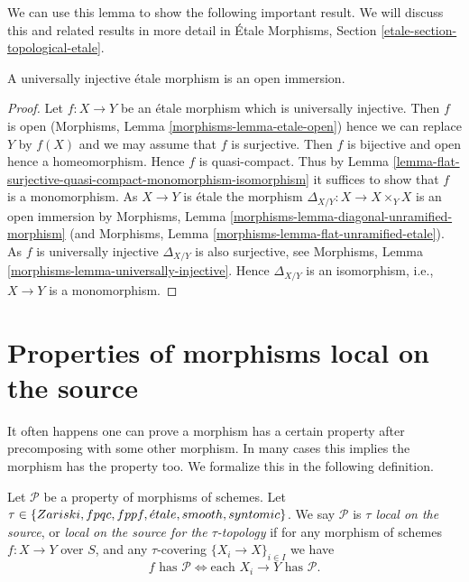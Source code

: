 \noindent
We can use this lemma to show the following important result.
We will discuss this and related results in more detail in
\'Etale Morphisms, Section \ref{etale-section-topological-etale}.

\begin{lemma}
\label{lemma-universally-injective-etale-open-immersion}
A universally injective \'etale morphism is an open immersion.
\end{lemma}

\begin{proof}
Let $f : X \to Y$ be an \'etale morphism which is universally injective.
Then $f$ is open
(Morphisms, Lemma \ref{morphisms-lemma-etale-open})
hence we can replace $Y$ by $f(X)$ and we may assume that $f$ is surjective.
Then $f$ is bijective and open hence a homeomorphism. Hence $f$ is
quasi-compact. Thus by
Lemma \ref{lemma-flat-surjective-quasi-compact-monomorphism-isomorphism}
it suffices to show that $f$ is a monomorphism. As $X \to Y$ is \'etale
the morphism $\Delta_{X/Y} : X \to X \times_Y X$ is an open immersion by
Morphisms, Lemma \ref{morphisms-lemma-diagonal-unramified-morphism}
(and
Morphisms, Lemma \ref{morphisms-lemma-flat-unramified-etale}).
As $f$ is universally injective $\Delta_{X/Y}$ is also surjective, see
Morphisms, Lemma \ref{morphisms-lemma-universally-injective}.
Hence $\Delta_{X/Y}$ is an isomorphism, i.e., $X \to Y$ is a monomorphism.
\end{proof}














\section{Properties of morphisms local on the source}
\label{section-properties-morphisms-local-source}

\noindent
It often happens one can prove a morphism has a certain property
after precomposing with some other morphism. In many cases this
implies the morphism has the property too. We formalize
this in the following definition.

\begin{definition}
\label{definition-property-morphisms-local-source}
Let $\mathcal{P}$ be a property of morphisms of schemes.
Let $\tau \in \{Zariski, \linebreak[0] fpqc, \linebreak[0] fppf, \linebreak[0]
\acute{e}tale, \linebreak[0] smooth, \linebreak[0] syntomic\}$.
We say $\mathcal{P}$ is
{\it $\tau$ local on the source}, or
{\it local on the source for the $\tau$-topology} if for
any morphism of schemes $f : X \to Y$ over $S$, and any
$\tau$-covering $\{X_i \to X\}_{i \in I}$ we
have
$$
f \text{ has }\mathcal{P}
\Leftrightarrow
\text{each }X_i \to Y\text{ has }\mathcal{P}.
$$
\end{definition}

